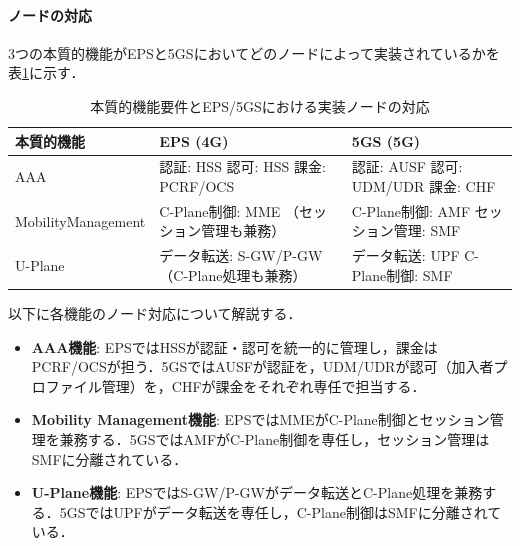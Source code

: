 \paragraph{ノードの対応}

3つの本質的機能がEPSと5GSにおいてどのノードによって実装されているかを表\ref{tab:essential_functions_mapping}に示す．

\begin{table}[htbp]
\centering
\caption{本質的機能要件とEPS/5GSにおける実装ノードの対応}
\label{tab:essential_functions_mapping}
\begin{tabular}{|p{3cm}|p{5.5cm}|p{5.5cm}|}
\hline
\textbf{本質的機能} & \textbf{EPS (4G)} & \textbf{5GS (5G)} \\
\hline
AAA &
認証: HSS\newline
認可: HSS\newline
課金: PCRF/OCS &
認証: AUSF\newline
認可: UDM/UDR\newline
課金: CHF \\
\hline
Mobility\newline Management &
C-Plane制御: MME\newline
（セッション管理も兼務） &
C-Plane制御: AMF\newline
セッション管理: SMF \\
\hline
U-Plane &
データ転送: S-GW/P-GW\newline
（C-Plane処理も兼務） &
データ転送: UPF\newline
C-Plane制御: SMF \\
\hline
\end{tabular}
\end{table}

以下に各機能のノード対応について解説する．

\begin{itemize}
  \item \textbf{AAA機能}: EPSではHSSが認証・認可を統一的に管理し，課金はPCRF/OCSが担う．5GSではAUSFが認証を，UDM/UDRが認可（加入者プロファイル管理）を，CHFが課金をそれぞれ専任で担当する．
  \item \textbf{Mobility Management機能}: EPSではMMEがC-Plane制御とセッション管理を兼務する．5GSではAMFがC-Plane制御を専任し，セッション管理はSMFに分離されている．
  \item \textbf{U-Plane機能}: EPSではS-GW/P-GWがデータ転送とC-Plane処理を兼務する．5GSではUPFがデータ転送を専任し，C-Plane制御はSMFに分離されている．
\end{itemize}

